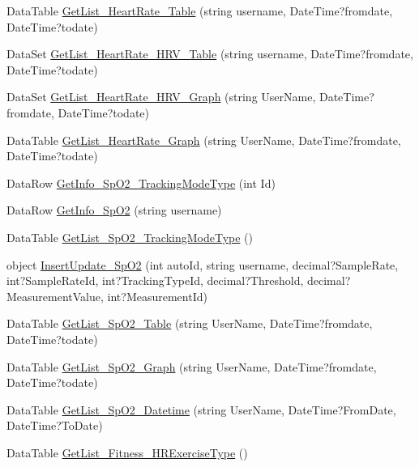 \begin{DoxyCompactItemize}
\item 
Data\-Table \hyperlink{class_d_b_class_aa0781e64398da82d4b983a8b31a4ea4a}{Get\-List\-\_\-\-Heart\-Rate\-\_\-\-Table} (string username, Date\-Time?fromdate, Date\-Time?todate)
\item 
Data\-Set \hyperlink{class_d_b_class_a5910d9e2fcad738599583bb202daf3c9}{Get\-List\-\_\-\-Heart\-Rate\-\_\-\-H\-R\-V\-\_\-\-Table} (string username, Date\-Time?fromdate, Date\-Time?todate)
\item 
Data\-Set \hyperlink{class_d_b_class_a1aa2f0b88239718cb99cde4a77899437}{Get\-List\-\_\-\-Heart\-Rate\-\_\-\-H\-R\-V\-\_\-\-Graph} (string User\-Name, Date\-Time?fromdate, Date\-Time?todate)
\item 
Data\-Table \hyperlink{class_d_b_class_a78b75c0c3f63847fb9d747200630bdd7}{Get\-List\-\_\-\-Heart\-Rate\-\_\-\-Graph} (string User\-Name, Date\-Time?fromdate, Date\-Time?todate)
\item 
Data\-Row \hyperlink{class_d_b_class_a8e9823ed71afddef6b015fd2af946c3e}{Get\-Info\-\_\-\-Sp\-O2\-\_\-\-Tracking\-Mode\-Type} (int Id)
\item 
Data\-Row \hyperlink{class_d_b_class_aee73d7edc2d2f75e0c26d2d31597039e}{Get\-Info\-\_\-\-Sp\-O2} (string username)
\item 
Data\-Table \hyperlink{class_d_b_class_a052d4479aabdcaeb5f05ca76c0d8e166}{Get\-List\-\_\-\-Sp\-O2\-\_\-\-Tracking\-Mode\-Type} ()
\item 
object \hyperlink{class_d_b_class_a0e272870de72fd2dfe58a8077219d379}{Insert\-Update\-\_\-\-Sp\-O2} (int auto\-Id, string username, decimal?Sample\-Rate, int?Sample\-Rate\-Id, int?Tracking\-Type\-Id, decimal?Threshold, decimal?Measurement\-Value, int?Measurement\-Id)
\item 
Data\-Table \hyperlink{class_d_b_class_a2c9db13225c35720f41b7e051df5740f}{Get\-List\-\_\-\-Sp\-O2\-\_\-\-Table} (string User\-Name, Date\-Time?fromdate, Date\-Time?todate)
\item 
Data\-Table \hyperlink{class_d_b_class_a6f06d1414a7be6b9ddfed14f682e2205}{Get\-List\-\_\-\-Sp\-O2\-\_\-\-Graph} (string User\-Name, Date\-Time?fromdate, Date\-Time?todate)
\item 
Data\-Table \hyperlink{class_d_b_class_a816b02ee42e328f3283c8ec99423f720}{Get\-List\-\_\-\-Sp\-O2\-\_\-\-Datetime} (string User\-Name, Date\-Time?From\-Date, Date\-Time?To\-Date)
\item 
Data\-Table \hyperlink{class_d_b_class_a7962b2e3bd666862aeb6ef63a6fc5a30}{Get\-List\-\_\-\-Fitness\-\_\-\-H\-R\-Exercise\-Type} ()
\item 

\end{DoxyCompactItemize}
